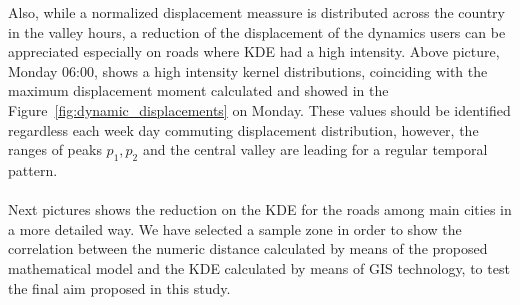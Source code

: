 Also, while a normalized displacement meassure is distributed across the country in the valley hours, a reduction of the displacement of the dynamics users can be appreciated especially on roads where KDE had a high intensity. Above picture,  Monday 06:00, shows a high intensity kernel distributions, coinciding with the maximum displacement moment calculated and showed in the Figure~\ref{fig:dynamic_displacements} on Monday. These values should be identified regardless each week day commuting displacement distribution, however, the ranges of peaks $p_1, p_2$ and the central valley are leading for a regular temporal pattern. 
\\
\\
Next pictures shows the reduction on the KDE for the roads among main cities in a more detailed way. We have selected a sample zone in order to show the correlation between the numeric distance calculated by means of the proposed mathematical model and the KDE calculated by means of GIS technology, to test the final aim proposed in this study.
\newpage

